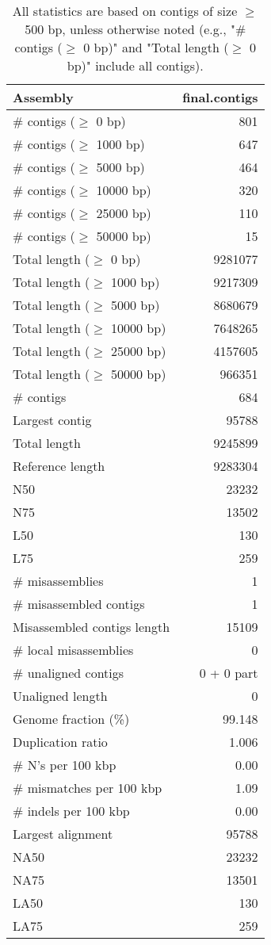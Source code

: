 \documentclass[12pt,a4paper]{article}
\begin{document}
\begin{table}[ht]
\begin{center}
\caption{All statistics are based on contigs of size $\geq$ 500 bp, unless otherwise noted (e.g., "\# contigs ($\geq$ 0 bp)" and "Total length ($\geq$ 0 bp)" include all contigs).}
\begin{tabular}{|l*{1}{|r}|}
\hline
Assembly & final.contigs \\ \hline
\# contigs ($\geq$ 0 bp) & 801 \\ \hline
\# contigs ($\geq$ 1000 bp) & 647 \\ \hline
\# contigs ($\geq$ 5000 bp) & 464 \\ \hline
\# contigs ($\geq$ 10000 bp) & 320 \\ \hline
\# contigs ($\geq$ 25000 bp) & 110 \\ \hline
\# contigs ($\geq$ 50000 bp) & 15 \\ \hline
Total length ($\geq$ 0 bp) & 9281077 \\ \hline
Total length ($\geq$ 1000 bp) & 9217309 \\ \hline
Total length ($\geq$ 5000 bp) & 8680679 \\ \hline
Total length ($\geq$ 10000 bp) & 7648265 \\ \hline
Total length ($\geq$ 25000 bp) & 4157605 \\ \hline
Total length ($\geq$ 50000 bp) & 966351 \\ \hline
\# contigs & 684 \\ \hline
Largest contig & 95788 \\ \hline
Total length & 9245899 \\ \hline
Reference length & 9283304 \\ \hline
N50 & 23232 \\ \hline
N75 & 13502 \\ \hline
L50 & 130 \\ \hline
L75 & 259 \\ \hline
\# misassemblies & 1 \\ \hline
\# misassembled contigs & 1 \\ \hline
Misassembled contigs length & 15109 \\ \hline
\# local misassemblies & 0 \\ \hline
\# unaligned contigs & 0 + 0 part \\ \hline
Unaligned length & 0 \\ \hline
Genome fraction (\%) & 99.148 \\ \hline
Duplication ratio & 1.006 \\ \hline
\# N's per 100 kbp & 0.00 \\ \hline
\# mismatches per 100 kbp & 1.09 \\ \hline
\# indels per 100 kbp & 0.00 \\ \hline
Largest alignment & 95788 \\ \hline
NA50 & 23232 \\ \hline
NA75 & 13501 \\ \hline
LA50 & 130 \\ \hline
LA75 & 259 \\ \hline
\end{tabular}
\end{center}
\end{table}
\end{document}
